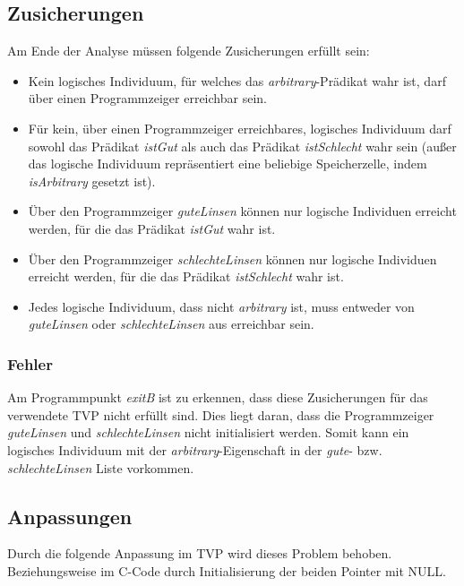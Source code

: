 \subsection{Zusicherungen}
Am Ende der Analyse müssen folgende Zusicherungen erfüllt sein:
\begin{itemize}
	\item Kein logisches Individuum, für welches das \emph{arbitrary}-Prädikat wahr ist, darf über einen Programmzeiger erreichbar sein.
	\item Für kein, über einen Programmzeiger erreichbares, logisches Individuum darf sowohl das Prädikat \emph{istGut} als auch das Prädikat \emph{istSchlecht} wahr sein (außer das logische Individuum repräsentiert eine beliebige Speicherzelle, indem \emph{isArbitrary} gesetzt ist).
	\item Über den Programmzeiger \emph{guteLinsen} können nur logische Individuen erreicht werden, für die das Prädikat \emph{istGut} wahr ist.
	\item Über den Programmzeiger \emph{schlechteLinsen} können nur logische Individuen erreicht werden, für die das Prädikat \emph{istSchlecht} wahr ist.
	\item Jedes logische Individuum, dass nicht \emph{arbitrary} ist, muss entweder von \emph{guteLinsen} oder \emph{schlechteLinsen} aus erreichbar sein.
\end{itemize}


\subsubsection{Fehler}
Am Programmpunkt \emph{exitB} ist zu erkennen, dass diese Zusicherungen für das verwendete TVP nicht erfüllt sind.
Dies liegt daran, dass die Programmzeiger \emph{guteLinsen} und \emph{schlechteLinsen} nicht initialisiert werden. Somit kann ein logisches Individuum mit der \emph{arbitrary}-Eigenschaft in der \emph{gute}- bzw. \emph{schlechteLinsen} Liste vorkommen.


\subsection{Anpassungen}
Durch die folgende Anpassung im TVP wird dieses Problem behoben.
Beziehungsweise im C-Code durch Initialisierung der beiden Pointer mit NULL.


